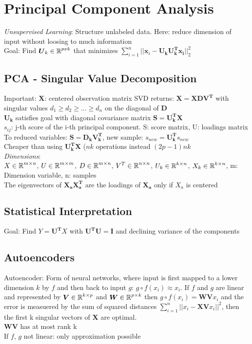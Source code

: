 \documentclass[english]{latex4ei/latex4ei_sheet}
\begin{document}
\section{Principal Component Analysis}
\begin{sectionbox}
\emph{Unsupervised Learning}: Structure unlabeled data. Here: reduce dimension of input without loosing to much information\\
Goal: Find $\boldsymbol{U}_k\in\operatorname{\mathbb R}^{pxk}$ that minimizes $\sum\limits_{i=1}^n||\boldsymbol{x}_i-\boldsymbol{U_kU_k^Tx_i}||^2_2$
\subsection{PCA - Singular Value Decomposition}
Important: $\boldsymbol{X}$: centered observation matrix
SVD returns: $\boldsymbol{X} = \boldsymbol{XDV^T}$ with singular values $d_1\ge d_2\ge ... \ge d_n$ on the diagonal of \textbf{D}\\
$\boldsymbol{U_k}$ satisfies goal with diagonal covariance matrix $\boldsymbol{S}=\boldsymbol{U_k^TX}$\\
$s_{ij}$: j-th score of the i-th principal component. S: score matrix, U: loadings matrix\\
To reduced variables: $\boldsymbol{S} = \boldsymbol{D_kV_k^T}$, new sample: $s_{new}=\boldsymbol{U_k^T}s_{new}$\\
Cheaper than using $\boldsymbol{U_k^TX}$ ($nk$ operations instead $(2p-1)nk$\\
\emph{Dimensions}:\\ $X\in\operatorname{\mathbb R}^{m\times n}$, $U\in\operatorname{\mathbb R}^{m\times m}$, $D\in\operatorname{\mathbb R}^{m\times n}$, $V^T\in\operatorname{\mathbb R}^{n\times n}$, $U_k\in\operatorname{\mathbb R}^{k\times n}$, $X_k\in\operatorname{\mathbb R}^{k\times n}$, m: Dimension variable, n: samples\\
The eigenvectors of $\mathbf{X_aX_a^T}$ are the loadings of $\mathbf{X_a}$ only if $X_a$ is centered

\subsection{Statistical Interpretation}
Goal: Find $Y=\boldsymbol{U^T}X$ with $\boldsymbol{U^TU=I}$ and declining variance of the components

\subsection{Autoencoders}
Autoencoder: Form of neural networks, where input is first mapped to a lower dimension $k$ by $f$ and then back to input $g$: $g\circ f(x_i) \approx x_i$.
If $f$ and $g$ are linear and represented by $\boldsymbol{V}\in\operatorname{\mathbb R}^{k\times p}$ and $\boldsymbol{W}\in\operatorname{\mathbb R}^{p\times k}$ then $g\circ f(x_i)=\boldsymbol{WV}x_i$ and the error is measuered by the sum of squared distances $\sum_{i=1}^n||x_i-\boldsymbol{XV}x_i||^2$, then the first k singular vectors of \textbf{X} are optimal. \\
\textbf{WV} has at most rank k\\
If $f$, $g$ not linear: only approximation possible
\end{sectionbox}
\end{document}
